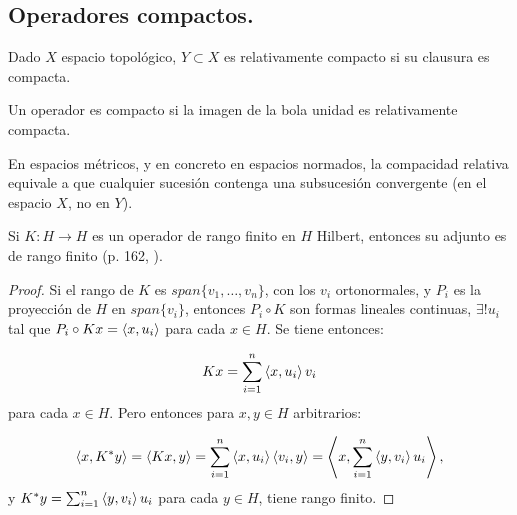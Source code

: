 \subsection{Operadores compactos.}

\begin{definition}
  Dado $X$ espacio topológico, $Y\subset X$ es relativamente compacto si su
  clausura es compacta.
\end{definition}

\begin{definition}
  Un operador es compacto si la imagen de la bola unidad es relativamente
  compacta.
\end{definition}

\begin{remark}
  En espacios métricos, y en concreto en espacios normados, la compacidad
  relativa equivale a que cualquier sucesión contenga una subsucesión
  convergente (en el espacio $X$, no en $Y$).
\end{remark}

\begin{lemma}
  \label{le:finite-range-adjoint}
  Si $K:H\to H$ es un operador de rango finito en $H$ Hilbert, entonces su
  adjunto es de rango finito (p. 162, \cite{cascales2012}).
\end{lemma}
\begin{proof}
  Si el rango de $K$ es $span\{v_1,\ldots,v_n\}$, con los $v_i$ ortonormales, y
  $P_i$ es la proyección de $H$ en $span \{v_i\}$, entonces $P_i\circ K$ son
  formas lineales continuas, $\exists ! u_i$ tal que $P_i\circ K x =
  \left\langle x,u_i\right\rangle$ para cada $x\in H$. Se tiene entonces:

   \[
  Kx = \sum_{i=1}^{n} \left\langle x,u_i\right\rangle v_i
  \] 
  para cada $x\in H$. Pero entonces para $x,y\in H$ arbitrarios:

  \[
  \left\langle x,K^*y\right\rangle=\left\langle Kx,y\right\rangle=\sum_{i=1}^{n} \left\langle x,u_i\right\rangle\left\langle v_i,y\right\rangle=
  \left\langle x,\sum_{i=1}^{n} \left\langle y,v_i\right\rangle u_i\right\rangle
  ,\] 
  y $K^*y=\sum_{i=1}^{n} \left\langle y,v_i\right\rangle u_i$ para cada $y\in H$, tiene rango
  finito.
\end{proof}

